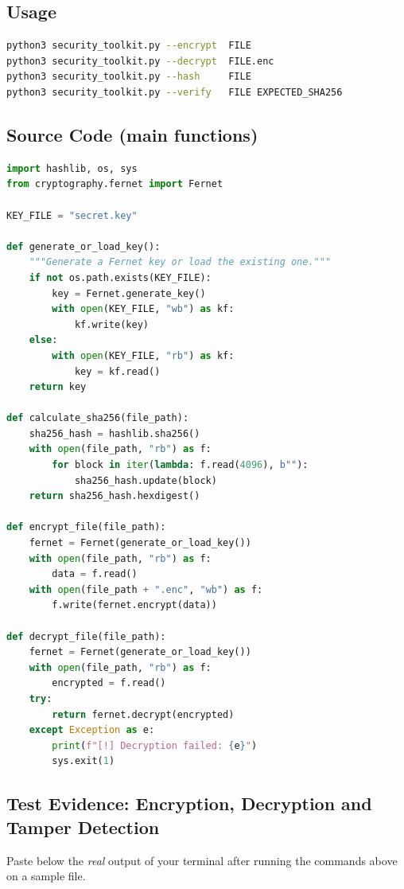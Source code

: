 \documentclass[11pt,a4paper]{article}
\begin{document}
\subsection{Usage}
\begin{lstlisting}[language=bash]
python3 security_toolkit.py --encrypt  FILE
python3 security_toolkit.py --decrypt  FILE.enc
python3 security_toolkit.py --hash     FILE
python3 security_toolkit.py --verify   FILE EXPECTED_SHA256
\end{lstlisting}

\subsection{Source Code (main functions)}
\begin{lstlisting}[language=Python]
import hashlib, os, sys
from cryptography.fernet import Fernet

KEY_FILE = "secret.key"

def generate_or_load_key():
    """Generate a Fernet key or load the existing one."""
    if not os.path.exists(KEY_FILE):
        key = Fernet.generate_key()
        with open(KEY_FILE, "wb") as kf:
            kf.write(key)
    else:
        with open(KEY_FILE, "rb") as kf:
            key = kf.read()
    return key

def calculate_sha256(file_path):
    sha256_hash = hashlib.sha256()
    with open(file_path, "rb") as f:
        for block in iter(lambda: f.read(4096), b""):
            sha256_hash.update(block)
    return sha256_hash.hexdigest()

def encrypt_file(file_path):
    fernet = Fernet(generate_or_load_key())
    with open(file_path, "rb") as f:
        data = f.read()
    with open(file_path + ".enc", "wb") as f:
        f.write(fernet.encrypt(data))

def decrypt_file(file_path):
    fernet = Fernet(generate_or_load_key())
    with open(file_path, "rb") as f:
        encrypted = f.read()
    try:
        return fernet.decrypt(encrypted)
    except Exception as e:
        print(f"[!] Decryption failed: {e}")
        sys.exit(1)
\end{lstlisting}

\subsection{Test Evidence: Encryption, Decryption and Tamper Detection}
Paste below the \emph{real} output of your terminal after running the
commands above on a sample file.
\end{document}
